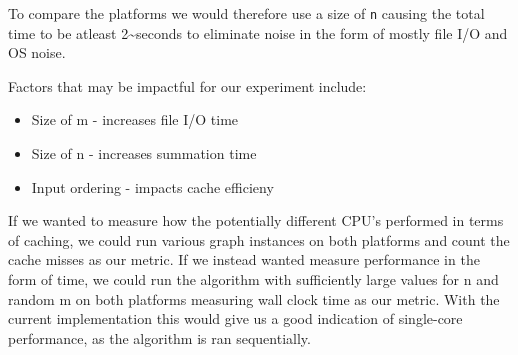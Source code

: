 \documentclass[a5paper]{article}
\begin{document}
  To compare the platforms we would therefore use a size of \texttt{n} causing the total time to be atleast 2\textasciitilde seconds to eliminate noise in the form of mostly file I/O and OS noise.

  Factors that may be impactful for our experiment include:
  \begin{itemize}
      \item Size of m - increases file I/O time
      \item Size of n - increases summation time
      \item Input ordering - impacts cache efficieny
  \end{itemize}

  If we wanted to measure how the potentially different CPU's performed in terms of caching, we could run various graph instances on both platforms and count the cache misses as our metric. If we instead wanted measure performance in the form of time, we could run the algorithm with sufficiently large values for n and random m on both platforms measuring wall clock time as our metric. With the current implementation this would give us a good indication of single-core performance, as the algorithm is ran sequentially.
\end{document}
